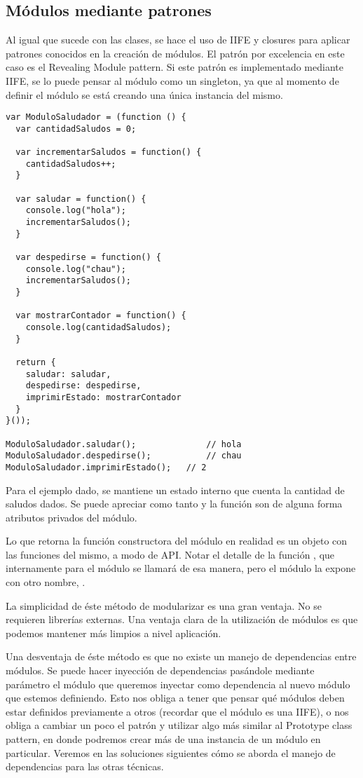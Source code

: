 \subsection{Módulos mediante patrones}

Al igual que sucede con las clases, se hace el uso de IIFE y closures para aplicar patrones conocidos en la creación de módulos. El patrón por excelencia en este caso es el Revealing Module pattern. Si este patrón es implementado mediante IIFE, se lo puede pensar al módulo como un singleton, ya que al momento de definir el módulo se está creando una única instancia del mismo.

\begin{lstlisting}[title={Revealing module pattern}]
var ModuloSaludador = (function () {
  var cantidadSaludos = 0;

  var incrementarSaludos = function() {
    cantidadSaludos++;
  }

  var saludar = function() {
    console.log("hola");
    incrementarSaludos();
  }

  var despedirse = function() {
    console.log("chau");
    incrementarSaludos();
  }

  var mostrarContador = function() {
    console.log(cantidadSaludos);
  }

  return {
    saludar: saludar,
    despedirse: despedirse,
    imprimirEstado: mostrarContador
  }
}());

ModuloSaludador.saludar();				// hola
ModuloSaludador.despedirse();			// chau
ModuloSaludador.imprimirEstado();	// 2
\end{lstlisting}

Para el ejemplo dado, se mantiene un estado interno que cuenta la cantidad de saludos dados. Se puede apreciar como tanto  y la función  son de alguna forma atributos privados del módulo. 

Lo que retorna la función constructora del módulo en realidad es un objeto con las funciones del mismo, a modo de API. Notar el detalle de la función , que internamente para el módulo se llamará de esa manera, pero el módulo la expone con otro nombre, .

La simplicidad de éste método de modularizar es una gran ventaja. No se requieren librerías externas. Una ventaja clara de la utilización de módulos es que podemos mantener  más limpios a nivel aplicación.

Una desventaja de éste método es que no existe un manejo de dependencias entre módulos. Se puede hacer inyección de dependencias pasándole mediante parámetro el módulo que queremos inyectar como dependencia al nuevo módulo que estemos definiendo. Esto nos obliga a tener que pensar qué módulos deben estar definidos previamente a otros (recordar que el módulo es una IIFE), o nos obliga a cambiar un poco el patrón y utilizar algo más similar al Prototype class pattern, en donde podremos crear más de una instancia de un módulo en particular. Veremos en las soluciones siguientes cómo se aborda el manejo de dependencias para las otras técnicas.

